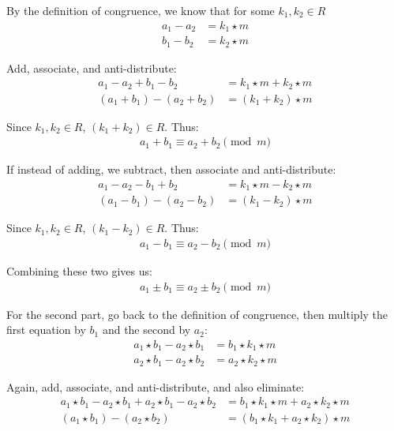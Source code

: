 \documentclass[11pt,fleqn]{article}
\begin{document}
By the definition of congruence, we know that for some $k_1, k_2 \in R$
\begin{align}
    a_1 - a_2 &= k_1 \star m \nonumber\\
    b_1 - b_2 &= k_2 \star m \nonumber
\end{align}

Add, associate, and anti-distribute:
\begin{align}
    a_1 - a_2 + b_1 - b_2 &= k_1 \star m + k_2 \star m \nonumber\\
    (a_1 + b_1) - (a_2 + b_2) &= (k_1 + k_2) \star m \nonumber
\end{align}

Since $k_1, k_2 \in R$, $(k_1 + k_2) \in R$.  Thus:
\begin{align}
a_1 + b_1 \equiv a_2 + b_2 \pmod{m}\nonumber
\end{align}

If instead of adding, we subtract, then associate and anti-distribute:
\begin{align}
    a_1 - a_2 - b_1 + b_2 &= k_1 \star m - k_2 \star m \nonumber\\
    (a_1 - b_1) - (a_2 - b_2) &= (k_1 - k_2) \star m \nonumber
\end{align}

Since $k_1, k_2 \in R$, $(k_1 - k_2) \in R$.  Thus:
\begin{align}
a_1 - b_1 \equiv a_2 - b_2 \pmod{m}\nonumber
\end{align}

Combining these two gives us:
\begin{align}
a_1 \pm b_1 \equiv a_2 \pm b_2 \pmod{m}\nonumber
\end{align}

For the second part, go back to the definition of congruence, then multiply the first equation by $b_1$ and the second by $a_2$:
\begin{align}
    a_1 \star b_1 - a_2 \star b_1 &= b_1 \star k_1 \star m \nonumber\\
    a_2 \star b_1 - a_2 \star b_2 &= a_2 \star k_2 \star m \nonumber
\end{align}

Again, add, associate, and anti-distribute, and also eliminate:
\begin{align}
    a_1 \star b_1 - a_2 \star b_1 + a_2 \star b_1 - a_2 \star b_2 &= b_1 \star k_1 \star m + a_2 \star k_2 \star m \nonumber\\
    (a_1 \star b_1) - (a_2 \star b_2) &= (b_1 \star k_1 + a_2 \star k_2) \star m \nonumber
\end{align}
\end{document}
